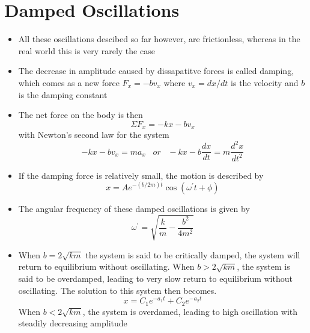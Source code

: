 \documentclass[11pt, a4paper]{article}
\begin{document}
\section{Damped Oscillations}
\begin{itemize}
    \item All these oscillations descibed so far however, are frictionless, whereas in the real
        world this is very rarely the case
    \item The decrease in amplitude caused by dissapatitve forces is called damping, which comes as
        a new force $F_{x} = -bv_{x}$ where $v_{x} = dx/dt$ is the velocity and $b$ is the damping
        constant
    \item The net force on the body is then
        \begin{equation}
            \Sigma{}F_{x} = -kx - bv_{x}
        \end{equation}
        with Newton’s second law for the system
        \begin{equation}
            -kx -bv_{x} = ma_{x} \; \; \; or \; \; \; -kx - b\frac{dx}{dt} =
            m\frac{d^{2}x}{dt^{2}}
        \end{equation}
    \item If the damping force is relatively small, the motion is described by
        \begin{equation}
            x = Ae^{-(b/2m)t}\cos(\omega^{\prime}t + \phi)
        \end{equation}
    \item The angular frequency of these damped oscillations is given by
        \begin{equation}
            \omega^{\prime} = \sqrt{\frac{k}{m}-\frac{b^{2}}{4m^{2}}}
        \end{equation}
    \item When $b = 2\sqrt{km}$ the system is said to be critically damped, the system will return
        to equilibrium without oscillating. When $b > 2\sqrt{km}$, the system is said to be
        overdamped, leading to very slow return to equilibrium without oscillating. The solution
        to this system then becomes.
        \begin{equation}
            x = C_{1}e^{-a_{1}t} + C_{2}e^{-a_{2}t}
        \end{equation}
        When $b < 2\sqrt{km}$, the system is overdamed, leading to high oscillation with steadily
        decreasing amplitude
\end{itemize}
\end{document}
